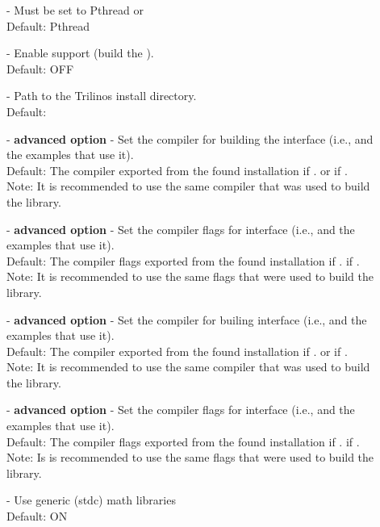 \begin{description}
\item[] -
  Must be set to Pthread or {\openmp}
  \\
  Default: Pthread
\item[] -
  Enable {\trilinos} support (build the {\tpetra} {\nvector}).
  \\
  Default: OFF
\item[] -
  Path to the Trilinos install directory.
  \\
  Default:
\item[] - \textbf{advanced option} -
  Set the {\CC} compiler for building the {\trilinos} interface
  (i.e., {\nvectrilinos} and the examples that use it).
  \\
  Default: The {\CC} compiler exported from the found {\trilinos} installation
  if .  or  if .
  \\
  Note: It is recommended to use the same compiler that was used to build the {\trilinos} library.
\item[] - \textbf{advanced option} -
  Set the {\CC} compiler flags for {\trilinos} interface
  (i.e., {\nvectrilinos} and the examples that use it).
  \\
  Default: The {\CC} compiler flags exported from the found {\trilinos} installation
  if .  if .
  \\
  Note: It is recommended to use the same flags that were used to build the {\trilinos} library.
\item[] - \textbf{advanced option} -
  Set the {\CPP} compiler for builing {\trilinos} interface
  (i.e., {\nvectrilinos} and the examples that use it).
  \\
  Default: The {\CPP} compiler exported from the found {\trilinos} installation
  if .  or  if .
  \\
  Note: It is recommended to use the same compiler that was used to build the {\trilinos} library.
\item[] - \textbf{advanced option} -
  Set the {\CPP} compiler flags for {\trilinos} interface
  (i.e., {\nvectrilinos} and the examples that use it).
  \\
  Default: The {\CPP} compiler flags exported from the found {\trilinos} installation
  if .  if .
  \\
  Note: Is is recommended to use the same flags that were used to build the {\trilinos} library.
\item[] -
  Use generic (stdc) math libraries
  \\
  Default: ON



\end{description}

